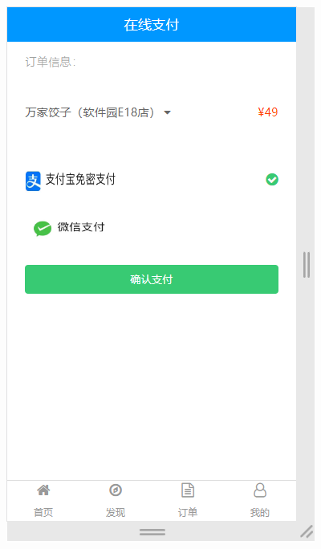 \begin{figure}[H]
{\begin{minipage}[t]{0.22\linewidth}
            \includegraphics[scale=0.3]{figures/2.2.5.png}\\

\end{minipage}}
\end{figure}

